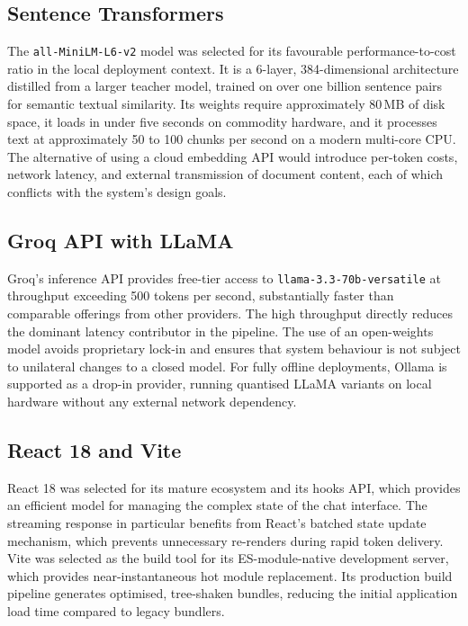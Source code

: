 \subsection{Sentence Transformers}

The \texttt{all-MiniLM-L6-v2} model was selected for its favourable performance-to-cost ratio in the local deployment context. It is a 6-layer, 384-dimensional architecture distilled from a larger teacher model, trained on over one billion sentence pairs for semantic textual similarity. Its weights require approximately 80\,MB of disk space, it loads in under five seconds on commodity hardware, and it processes text at approximately 50 to 100 chunks per second on a modern multi-core CPU. The alternative of using a cloud embedding API would introduce per-token costs, network latency, and external transmission of document content, each of which conflicts with the system's design goals.

\subsection{Groq API with LLaMA}

Groq's inference API provides free-tier access to \texttt{llama-3.3-70b-versatile} at throughput exceeding 500 tokens per second, substantially faster than comparable offerings from other providers. The high throughput directly reduces the dominant latency contributor in the pipeline. The use of an open-weights model avoids proprietary lock-in and ensures that system behaviour is not subject to unilateral changes to a closed model. For fully offline deployments, Ollama is supported as a drop-in provider, running quantised LLaMA variants on local hardware without any external network dependency.

\subsection{React 18 and Vite}

React 18 was selected for its mature ecosystem and its hooks API, which provides an efficient model for managing the complex state of the chat interface. The streaming response in particular benefits from React's batched state update mechanism, which prevents unnecessary re-renders during rapid token delivery. Vite was selected as the build tool for its ES-module-native development server, which provides near-instantaneous hot module replacement. Its production build pipeline generates optimised, tree-shaken bundles, reducing the initial application load time compared to legacy bundlers.

